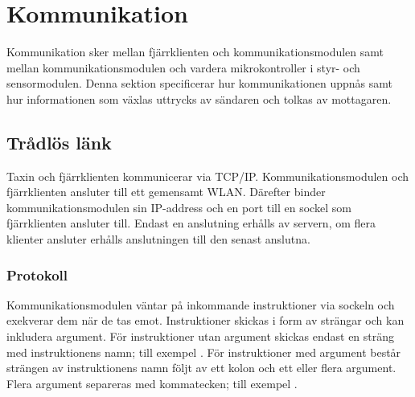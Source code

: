 \documentclass[tekniskrapport/tech.tex]{subfiles}
\begin{document}
\section{Kommunikation}
Kommunikation sker mellan fjärrklienten och kommunikationsmodulen samt mellan
kommunikationsmodulen och vardera mikrokontroller i styr- och sensormodulen.
Denna sektion specificerar hur kommunikationen uppnås samt hur informationen
som växlas uttrycks av sändaren och tolkas av mottagaren.

\subsection{Trådlös länk}
Taxin och fjärrklienten kommunicerar via TCP/IP. Kommunikationsmodulen och
fjärrklienten ansluter till ett gemensamt WLAN. Därefter binder
kommunikationsmodulen sin IP-address och en port till en sockel som
fjärrklienten ansluter till. Endast en anslutning erhålls av servern, om flera
klienter ansluter erhålls anslutningen till den senast anslutna.

\subsubsection{Protokoll}
\label{sec:wlproto}
Kommunikationsmodulen väntar på inkommande instruktioner via sockeln och
exekverar dem när de tas emot. Instruktioner skickas i form av strängar och kan
inkludera argument. För instruktioner utan argument skickas endast en sträng
med instruktionens namn; till exempel . För instruktioner med
argument består strängen av instruktionens namn följt av ett kolon och ett
eller flera argument. Flera argument separeras med kommatecken; till exempel
.
\end{document}
